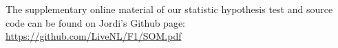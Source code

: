 The supplementary online material of our statistic hypothesis test and source code can be found on Jordi's Github page: \url{https://github.com/LiveNL/F1/SOM.pdf}